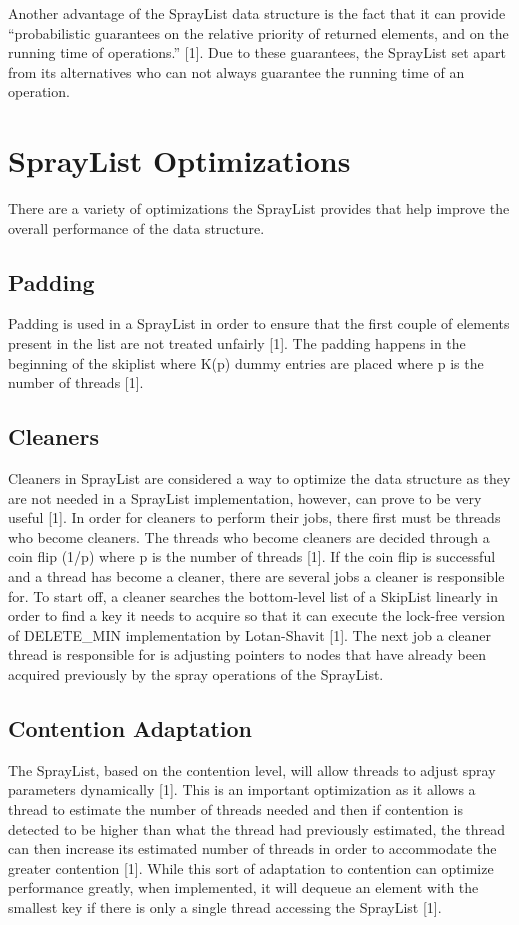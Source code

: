 \documentclass[conference]{IEEEtran}
\begin{document}
Another advantage of the SprayList data structure is the fact that it can provide “probabilistic guarantees on the relative priority of returned elements, and on the running time of operations.” [1]. Due to these guarantees, the SprayList set apart from its alternatives who can not always guarantee the running time of an operation. 

\section{SprayList Optimizations}
There are a variety of optimizations the SprayList provides that help improve the overall performance of the data structure.

\subsection{Padding}

Padding is used in a SprayList in order to ensure that the first couple of elements present in the list are not treated unfairly [1]. The padding happens in the beginning of the skiplist where K(p) dummy entries are placed where p is the number of threads [1].

\subsection{Cleaners}
Cleaners in SprayList are considered a way to optimize the data structure as they are not needed in a SprayList implementation, however, can prove to be very useful [1]. In order for cleaners to perform their jobs, there first must be threads who become cleaners. The threads who become cleaners are decided through a coin flip (1/p) where p is the number of threads [1]. If the coin flip is successful and a thread has become a cleaner, there are several jobs a cleaner is responsible for. To start off, a cleaner searches the bottom-level list of a SkipList linearly in order to find a key it needs to acquire so that it can execute the lock-free version of DELETE\_MIN implementation by Lotan-Shavit [1]. The next job a cleaner thread is responsible for is adjusting pointers to nodes that have already been acquired previously by the spray operations of the SprayList.

\subsection{Contention Adaptation}

The SprayList, based on the contention level, will allow threads to adjust spray parameters dynamically [1]. This is an important optimization as it allows a thread to estimate the number of threads needed and then if contention is detected to be higher than what the thread had previously estimated, the thread can then increase its estimated number of threads in order to accommodate the greater contention [1]. While this sort of adaptation to contention can optimize performance greatly, when implemented, it will dequeue an element with the smallest key if there is only a single thread accessing the SprayList [1].
\end{document}

